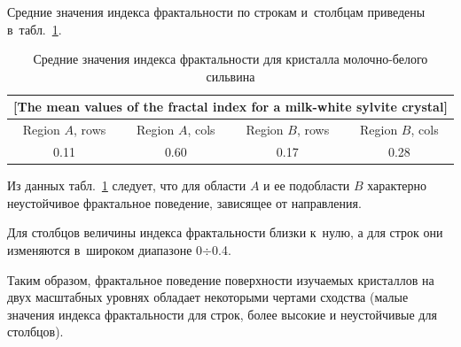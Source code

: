 Средние значения индекса фрактальности по строкам и~столбцам приведены в~табл.~\ref{un:tabl02}. 



\begin{table}[b!]



\small \centering



\caption{Средние значения индекса фрактальности для кристалла молочно-белого сильвина \label{un:tabl02}}

\vspace{-6mm}

\renewcommand{\tabcolsep}{0.6cm}

\begin{tabular}{|c|c|c|c|}

\multicolumn{4}{c}{[The mean values of the fractal index for a milk-white sylvite  crystal] }\\

\hline

\rule{0mm}{11pt}%

\footnotesize  Region $A$, rows & \footnotesize   Region $A$, cols & 

\footnotesize  Region $B$, rows & \footnotesize   Region $B$, cols \\

            \hline

            \rule{0mm}{12pt}%

            \phantom{1} 0.11 & 0.60 & 0.17 & 0.28\\

            \hline

        \end{tabular}

\end{table} 



Из данных табл.~\ref{un:tabl02} следует, что для области $A$ и ее подобласти $B$ характерно неустойчивое фрактальное поведение, зависящее от направления. 

Для столбцов величины индекса фрактальности близки к~нулю, а для строк они изменяются в~широком диапазоне 0${\div}$0.4. 



Таким образом, фрактальное поведение поверхности изучаемых кристаллов на двух масштабных уровнях обладает некоторыми чертами сходства (малые значения индекса фрактальности для строк, более высокие и неустойчивые для столбцов).

